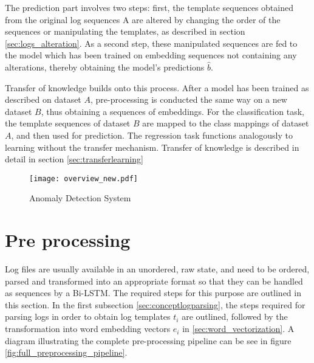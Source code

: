 The prediction part involves two steps: first, the template sequences obtained from the original log sequences A are altered by changing the order of the sequences or manipulating the templates, as described in section \ref{sec:logs_alteration}. As a second step, these manipulated sequences are fed to the model which has been trained on embedding sequences not containing any alterations, thereby obtaining the model's predictions $\hat{b}$.

Transfer of knowledge builds onto this process. After a model has been trained as described on dataset $A$, pre-processing is conducted the same way on a new dataset $B$, thus obtaining a sequences of embeddings. For the classification task, the template sequences of dataset $B$ are mapped to the class mappings of dataset $A$, and then used for prediction. The regression task functions analogously to learning without the transfer mechanism. Transfer of knowledge is described in detail in section \ref{sec:transferlearning}

\begin{figure}[h]
	\centering
	\texttt{[image: overview\_new.pdf]}
	\caption{Anomaly Detection System}
	\label{fig:overall_system}
\end{figure}

\newpage
\section{Pre processing \label{sec:pre_processing}}
Log files are usually available in an unordered, raw state, and need to be ordered, parsed and transformed into an appropriate format so that they can be handled as sequences by a Bi-LSTM. The required steps for this purpose are outlined in this section. In the first subsection \ref{sec:conceptlogparsing}, the steps required for parsing logs in order to obtain log templates $t_i$ are outlined, followed by the transformation into word embedding vectors $e_i$ in \ref{sec:word_vectorization}. A diagram illustrating the complete pre-processing pipeline can be see in figure \ref{fig:full_preprocessing_pipeline}.

